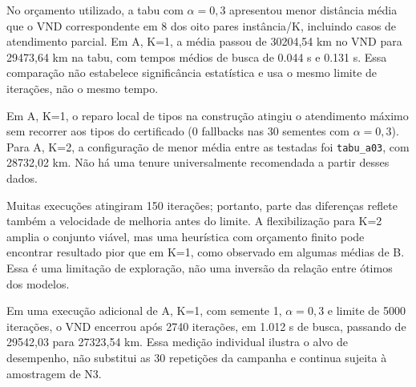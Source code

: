 No orçamento utilizado, a tabu com $\alpha=0{,}3$ apresentou menor distância média que o VND correspondente em 8 dos oito pares instância/K, incluindo casos de atendimento parcial. Em A, K=1, a média passou de 30204,54 km no VND para 29473,64 km na tabu, com tempos médios de busca de 0.044 s e 0.131 s. Essa comparação não estabelece significância estatística e usa o mesmo limite de iterações, não o mesmo tempo.

Em A, K=1, o reparo local de tipos na construção atingiu o atendimento máximo sem recorrer aos tipos do certificado (0 fallbacks nas 30 sementes com $\alpha=0{,}3$). Para A, K=2, a configuração de menor média entre as testadas foi \texttt{tabu\_a03}, com 28732,02 km. Não há uma tenure universalmente recomendada a partir desses dados.

Muitas execuções atingiram 150 iterações; portanto, parte das diferenças reflete também a velocidade de melhoria antes do limite. A flexibilização para K=2 amplia o conjunto viável, mas uma heurística com orçamento finito pode encontrar resultado pior que em K=1, como observado em algumas médias de B. Essa é uma limitação de exploração, não uma inversão da relação entre ótimos dos modelos.

Em uma execução adicional de A, K=1, com semente 1, $\alpha=0{,}3$ e limite de 5000 iterações, o VND encerrou após 2740 iterações, em 1.012 s de busca, passando de 29542,03 para 27323,54 km. Essa medição individual ilustra o alvo de desempenho, não substitui as 30 repetições da campanha e continua sujeita à amostragem de N3.
